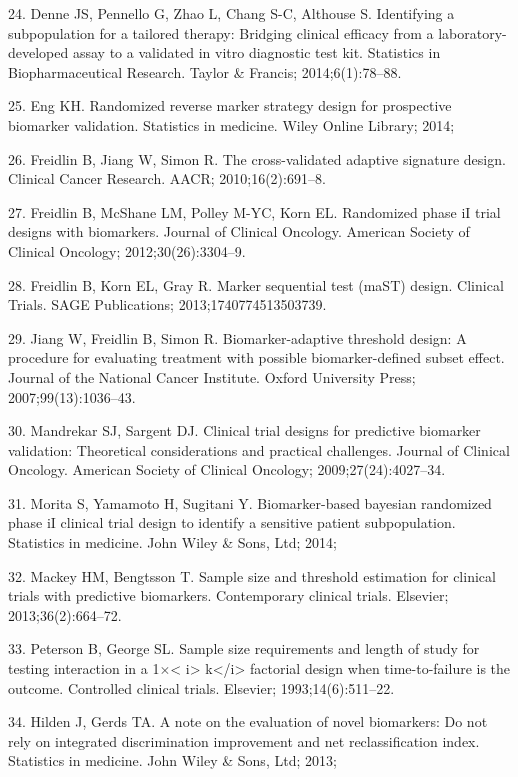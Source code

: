 \documentclass[11pt]{article}
\begin{document}
24. Denne JS, Pennello G, Zhao L, Chang S-C, Althouse S. Identifying a
subpopulation for a tailored therapy: Bridging clinical efficacy from a
laboratory-developed assay to a validated in vitro diagnostic test kit.
Statistics in Biopharmaceutical Research. Taylor \& Francis;
2014;6(1):78--88.

25. Eng KH. Randomized reverse marker strategy design for prospective
biomarker validation. Statistics in medicine. Wiley Online Library;
2014;

26. Freidlin B, Jiang W, Simon R. The cross-validated adaptive signature
design. Clinical Cancer Research. AACR; 2010;16(2):691--8.

27. Freidlin B, McShane LM, Polley M-YC, Korn EL. Randomized phase iI
trial designs with biomarkers. Journal of Clinical Oncology. American
Society of Clinical Oncology; 2012;30(26):3304--9.

28. Freidlin B, Korn EL, Gray R. Marker sequential test (maST) design.
Clinical Trials. SAGE Publications; 2013;1740774513503739.

29. Jiang W, Freidlin B, Simon R. Biomarker-adaptive threshold design: A
procedure for evaluating treatment with possible biomarker-defined
subset effect. Journal of the National Cancer Institute. Oxford
University Press; 2007;99(13):1036--43.

30. Mandrekar SJ, Sargent DJ. Clinical trial designs for predictive
biomarker validation: Theoretical considerations and practical
challenges. Journal of Clinical Oncology. American Society of Clinical
Oncology; 2009;27(24):4027--34.

31. Morita S, Yamamoto H, Sugitani Y. Biomarker-based bayesian
randomized phase iI clinical trial design to identify a sensitive
patient subpopulation. Statistics in medicine. John Wiley \& Sons, Ltd;
2014;

32. Mackey HM, Bengtsson T. Sample size and threshold estimation for
clinical trials with predictive biomarkers. Contemporary clinical
trials. Elsevier; 2013;36(2):664--72.

33. Peterson B, George SL. Sample size requirements and length of study
for testing interaction in a 1\(\times\)\textless{} i\textgreater{}
k\textless{}/i\textgreater{} factorial design when time-to-failure is
the outcome. Controlled clinical trials. Elsevier; 1993;14(6):511--22.

34. Hilden J, Gerds TA. A note on the evaluation of novel biomarkers: Do
not rely on integrated discrimination improvement and net
reclassification index. Statistics in medicine. John Wiley \& Sons, Ltd;
2013;
\end{document}
